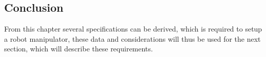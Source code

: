 \subsection{Conclusion}

From this chapter several specifications can be derived, which is required to setup a robot manipulator, these data and considerations will thus be used for the next section, which will describe these requirements.













